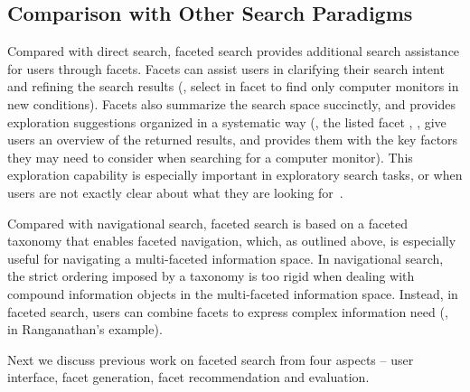 
\subsection{Comparison with Other Search Paradigms}
Compared with direct search, faceted search provides additional search assistance for users through facets. Facets can assist users in clarifying their search intent and refining the search results (\eg, select  in facet  to find only computer monitors in new conditions). Facets also summarize the search space succinctly, and provides exploration suggestions organized in a systematic way (\eg, the listed facet , ,  give users an overview of the returned results, and provides them with the key factors they may need to consider when searching for a computer monitor). This exploration capability is especially important in exploratory search tasks, or when users are not exactly clear about what they are looking for~\cite{kules2009exploratory,sacco2009dynamic}.

Compared with navigational search, faceted search is based on a faceted taxonomy that enables faceted navigation, which, as outlined above, is especially useful for navigating a multi-faceted information space. In navigational search, the strict ordering imposed by a taxonomy is too rigid when dealing with compound information objects in the multi-faceted information space. Instead, in faceted search, users can combine facets to express complex information need (\eg,  in  Ranganathan's example).

Next we discuss previous work on faceted search from four aspects -- user interface, facet generation, facet recommendation and evaluation.

